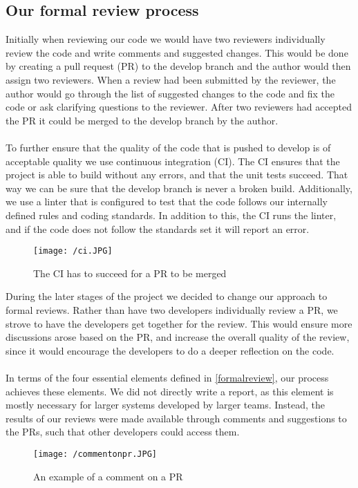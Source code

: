 \subsection{Our formal review process}
Initially when reviewing our code we would have two reviewers individually review the code and write comments and suggested changes. 
This would be done by creating a pull request (PR) to the develop branch and the author would then assign two reviewers.
When a review had been submitted by the reviewer, the author would go through the list of suggested changes to the code and fix the code or ask clarifying questions to the reviewer.
After two reviewers had accepted the PR it could be merged to the develop branch by the author. 
\\\\
To further ensure that the quality of the code that is pushed to develop is of acceptable quality we use continuous integration (CI).
The CI ensures that the project is able to build without any errors, and that the unit tests succeed. 
That way we can be sure that the develop branch is never a broken build.
Additionally, we use a linter that is configured to test that the code follows our internally defined rules and coding standards. 
In addition to this, the CI runs the linter, and if the code does not follow the standards set it will report an error.
\begin{figure}[H]
    \texttt{[image: /ci.JPG]}
    \caption{The CI has to succeed for a PR to be merged}
    \label{fig:continous-integration}
\end{figure}
\noindent
During the later stages of the project we decided to change our approach to formal reviews.
Rather than have two developers individually review a PR, we strove to have the developers get together for the review.
This would ensure more discussions arose based on the PR, and increase the overall quality of the review, since it would encourage the developers to do a deeper reflection on the code.
\\\\
In terms of the four essential elements defined in \autoref{formalreview}, our process achieves these elements.
We did not directly write a report, as this element is mostly necessary for larger systems developed by larger teams.
Instead, the results of our reviews were made available through comments and suggestions to the PRs, such that other developers could access them.
\begin{figure}[H]
    \texttt{[image: /commentonpr.JPG]}
    \caption{An example of a comment on a PR}
    \label{fig:comment-on-pr}
\end{figure}
